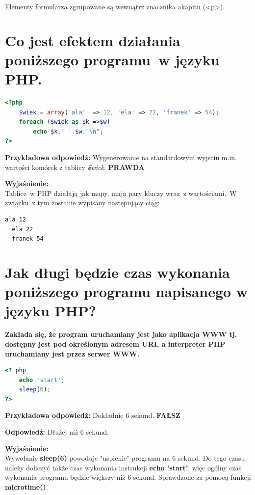 Elementy formularza zgrupowane są wewnątrz znacznika akapitu (<p>).

\section{Co jest efektem działania poniższego programu~w języku PHP.}
\begin{lstlisting}[language=php, frame=single]
<?php
    $wiek = array('ala'  => 12, 'ela' => 22, 'franek' => 54);
    foreach ($wiek as $k =>$w)
        echo $k.' '.$w."\n";
?>
\end{lstlisting}
{\textbf{Przykładowa odpowiedź:}}
Wygenerowanie na standardowym wyjsciu m.in. wartości komórek z tablicy  \textit{\$wiek}.
\textbf{PRAWDA}

\vspace{0.4cm}

\noindent
\textbf{Wyjaśnienie:}\\
\noindent
Tablice~w PHP działają jak mapy, mają pary kluczy wraz~z wartościami.~W związku~z tym zostanie wypisany następujący ciąg:
\begin{lstlisting}[language=html,frame=single]
  ala 12
  ela 22
  franek 54
\end{lstlisting}
\vspace{0.4cm}

\section{Jak długi będzie czas wykonania poniższego programu napisanego w języku PHP?}
\noindent
\textbf{Zakłada się, że program uruchamiany jest jako aplikacja WWW tj. dostępny jest pod określonym adresem URI, a interpreter PHP uruchamiany jest przez serwer WWW.}

\begin{lstlisting}[language=php,frame=single]
<? php
    echo 'start';
    sleep(6);
?>

\end{lstlisting}
{\textbf{Przykładowa odpowiedź:}}
Dokładnie 6 sekund.
\textbf{FAŁSZ}

\vspace{0.4cm}
\noindent
\textbf{Odpowiedź:}
Dłużej niż 6 sekund.
\vspace{0.4cm}

\noindent
\textbf{Wyjaśnienie:}\\
\noindent
Wywołanie \textbf{sleep(6)} powoduje "uśpienie" programu na 6 sekund. Do tego czasu należy doliczyć także czas wykonania instrukcji \textbf{echo 'start'}, więc ogólny czas wykonania programu będzie większy niż 6 sekund. Sprawdzone za pomocą funkcji \textbf{microtime()}.

